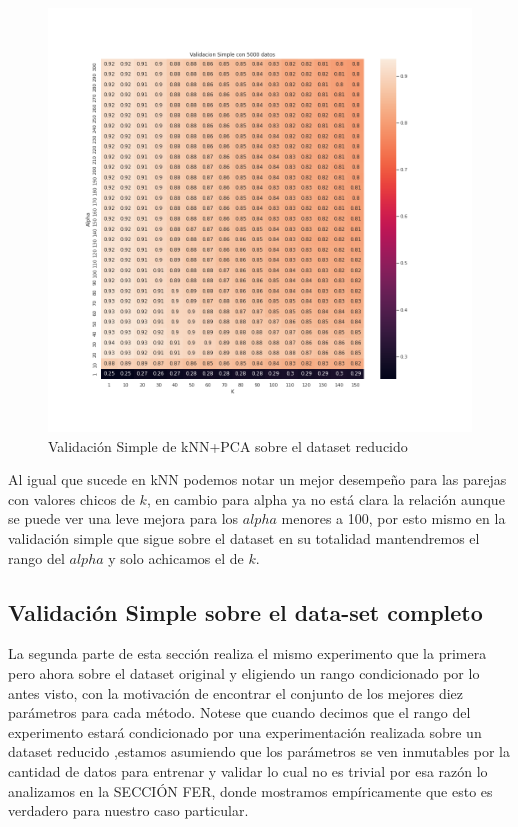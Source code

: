 \begin{figure}[H]
    \centering
    \includegraphics[width=12cm]{images/validacionSimple_heatmap_datasetRedux}%
    \qquad
    \caption{Validación Simple de kNN+PCA sobre el dataset reducido}
    \label{knnpca_preliminar}%
\end{figure}

Al igual que sucede en kNN podemos notar un mejor desempeño para las parejas con valores chicos de $k$, en cambio para alpha ya no está clara la relación aunque se puede ver una leve mejora para los $alpha$ menores a 100, por esto mismo en la validación simple que sigue sobre el dataset en su totalidad mantendremos el rango del $alpha$ y solo achicamos el de $k$.

\subsection{Validación Simple sobre el data-set completo}

La segunda parte de esta sección realiza el mismo experimento que la primera pero ahora sobre el dataset original y eligiendo un rango condicionado por lo antes visto, con la motivación de encontrar el conjunto de los mejores diez parámetros para cada método. Notese que cuando decimos que el rango del experimento estará condicionado por una experimentación realizada sobre un dataset reducido ,estamos asumiendo que los parámetros se ven inmutables por la cantidad de datos para entrenar y validar lo cual no es trivial por esa razón lo analizamos en la SECCIÓN FER, donde mostramos empíricamente que esto es verdadero para nuestro caso particular.


